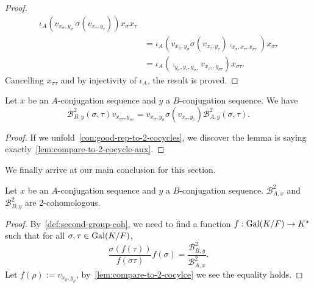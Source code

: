 \begin{proof}
\[\begin{aligned}
                                                                                                                                      \iota_{A}\left(v_{x_{\sigma},y_{\sigma}}\, \sigma\left(v_{x_{\tau},y_{\tau}}\right)\right) x_{\sigma}x_{\tau} \\
      &= \iota_{A}\left(v_{x_{\sigma},y_{\sigma}}\sigma\left(v_{x_{\tau},y_{\tau}}\right)\comp_{x_{\sigma},x_{\tau},x_{\sigma\tau}}\right)x_{\sigma\tau}\\
      &= \iota_{A}\left(\comp_{y_{\sigma},y_{\tau},y_{\sigma\tau}}v_{x_{\sigma\tau},y_{\sigma\tau}}\right)x_{\sigma\tau}.
    \end{aligned}
  \]
  Cancelling $x_{\sigma\tau}$ and by injectivity of $\iota_{A}$, the result is proved.
\end{proof}

\begin{lemma}\label{lem:compare-to-2-cocylce}
  Let $x$ be an $A$-conjugation sequence and $y$ a $B$-conjugation sequence. We have
  \[
    \mathcal{B}^{2}_{B,y}(\sigma,\tau) v_{x_{\sigma\tau},y_{\sigma\tau}} =
    v_{x_{\sigma},y_{\sigma}} \sigma\left(v_{x_{\tau},y_{\tau}}\right) \mathcal{B}^{2}_{A,y}(\sigma,\tau).
  \]
  \leanok
\end{lemma}

\begin{proof}
  If we unfold~\cref{con:good-rep-to-2-cocycles}, we discover the lemma is saying exactly~\cref{lem:compare-to-2-cocycle-aux}.
\end{proof}

We finally arrive at our main conclusion for this section.
\begin{corollary}\label{cor:to-2-cocylce-wd}
  Let $x$ be an $A$-conjugation sequence and $y$ a $B$-conjugation sequence. $\mathcal{B}^{2}_{A,x}$ and $\mathcal{B}^{2}_{B,y}$ are 2-cohomologous.
  \leanok
\end{corollary}
\begin{proof}
  By~\cref{def:second-group-coh}, we need to find a function $f : \operatorname{Gal}(K/F)\to K^{\star}$ such that for all $\sigma, \tau\in\operatorname{Gal}(K/F)$,
  \[
    \frac{\sigma\left(f(\tau)\right)}{f\left(\sigma\tau\right)}f(\sigma)=\frac{\mathcal{B}^{2}_{B,y}}{\mathcal{B}^{2}_{A,x}}.
  \]
  Let $f(\rho) := v_{x_{\rho},y_{\rho}}$, by~\cref{lem:compare-to-2-cocylce} we see the equality holds.
\end{proof}

